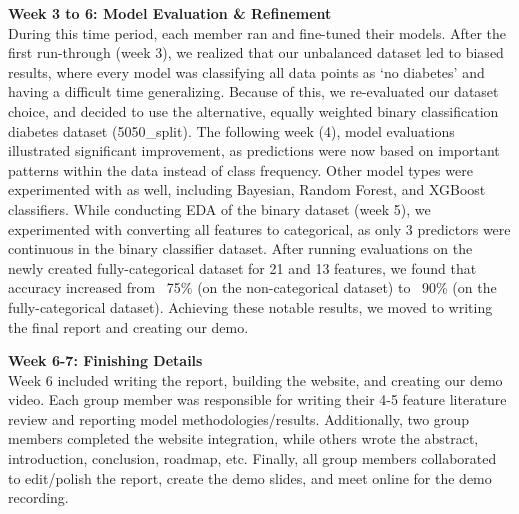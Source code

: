 \documentclass[conference]{IEEEtran}
\begin{document}
\noindent\textbf{Week 3 to 6: Model Evaluation \& Refinement}\\
During this time period, each member ran and fine-tuned their models. After the first run-through (week 3), we realized that our unbalanced dataset led to biased results, where every model was classifying all data points as ‘no diabetes’ and having a difficult time generalizing. Because of this, we re-evaluated our dataset choice, and decided to use the alternative, equally weighted binary classification diabetes dataset (5050\_split). The following week (4), model evaluations illustrated significant improvement, as predictions were now based on important patterns within the data instead of class frequency. Other model types were experimented with as well, including Bayesian, Random Forest, and XGBoost classifiers. While conducting EDA of the binary dataset (week 5), we experimented with converting all features to categorical, as only 3 predictors were continuous in the binary classifier dataset. After running evaluations on the newly created fully-categorical dataset for 21 and 13 features, we found that accuracy increased from ~75\% (on the non-categorical dataset) to ~90\% (on the fully-categorical dataset). Achieving these notable results, we moved to writing the final report and creating our demo.

\vspace{1em}

\noindent\textbf{Week 6-7: Finishing Details}\\
Week 6 included writing the report, building the website, and creating our demo video. Each group member was responsible for writing their 4-5 feature literature review and reporting model methodologies/results. Additionally, two group members completed the website integration, while others wrote the abstract, introduction, conclusion, roadmap, etc. Finally, all group members collaborated to edit/polish the report, create the demo slides, and meet online for the demo recording.




\end{document}
